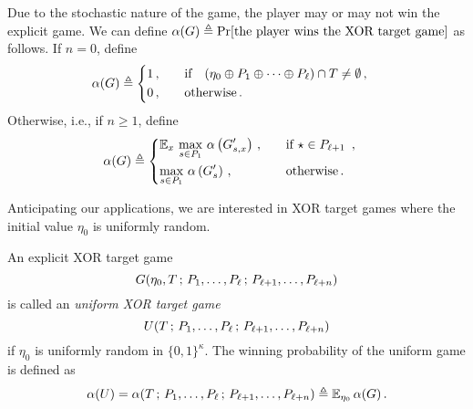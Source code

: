 Due to the stochastic nature of the game, 
the player may or may not win the explicit game. 
We can define 
$\alpha(G) \triangleq \Pr[\text{the player wins the XOR target game}]$
as follows.
If $n = 0$, define
\begin{align*}
    \alpha(G) &\triangleq 
    \begin{dcases}
        1\,, & \quad\text{if}\quad (\eta_0 \oplus P_1 \oplus \cdots \oplus P_\ell) \cap T \neq \emptyset 
        \, , \\
        0\,, & \quad\text{otherwise}
        \, .
    \end{dcases}
\end{align*}
Otherwise, i.e., if $n \geq 1$, 
define 
\begin{align}\label{eq:winning-prob}
    \alpha(G) &\triangleq 
    \begin{dcases}
        \operatorname{\mathbb{E}}_{x}\, 
            \max_{s \in P_1 }\, 
            \alpha\left(
                G^\prime_{s, x}
                \right) 
        \,, &\quad\text{if $\star \in P_{\ell + 1}$ }\,,
        \\
        \max_{s \in P_1 }\, 
        \alpha\left(
            G^\prime_s
            \right)
        \,, &\quad\text{otherwise} \,.
    \end{dcases}
\end{align}


Anticipating our applications, 
we are interested in XOR target games where the initial value $\eta_0$ is uniformly random. 
\begin{definition}
    \label{def:xor-game-uniform}
    An explicit XOR target game $$G(\eta_0,T\,;\, P_1, \ldots, P_\ell \,;\, P_{\ell+1}, \ldots, P_{\ell+n})$$ 
    is called 
    an \emph{uniform XOR target game}
    \[
        U(T\,;\, P_1, \ldots, P_\ell \,;\, P_{\ell+1}, \ldots, P_{\ell+n})
    \]
    if $\eta_0$ is uniformly random in $\{0,1\}^\kappa$. 
    The winning probability of the uniform game is defined as 
    \[
        \alpha(U) = \alpha(T\,;\, P_1, \ldots, P_\ell \,;\, P_{\ell+1}, \ldots, P_{\ell+n}) 
        \triangleq \operatorname{\mathbb{E}}_{\eta_0} \alpha(G)\,.
    \]
\end{definition}


